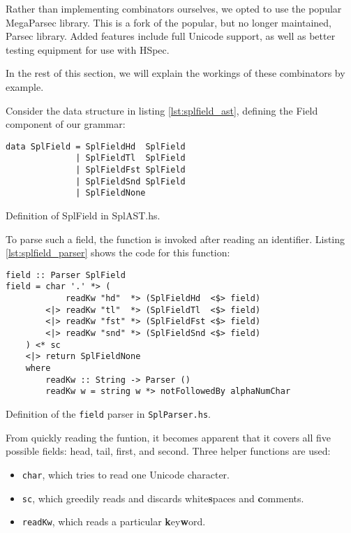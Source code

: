 Rather than implementing combinators ourselves, we opted to use the popular MegaParsec library.
This is a fork of the popular, but no longer maintained, Parsec library.
Added features include full Unicode support, as well as better testing equipment for use with HSpec.

In the rest of this section, we will explain the workings of these combinators by example.

Consider the data structure in listing \ref{lst:splfield_ast}, defining the \textsf{Field} component of our grammar:

\begin{listing}
\begin{framed}
\begin{verbatim}
data SplField = SplFieldHd  SplField
              | SplFieldTl  SplField
              | SplFieldFst SplField
              | SplFieldSnd SplField
              | SplFieldNone
\end{verbatim}
\end{framed}
\caption{Definition of SplField in SplAST.hs.}
\label{lst:splfield_ast}
\end{listing}

To parse such a field, the  function is invoked after reading an identifier.
Listing \ref{lst:splfield_parser} shows the code for this function:

\begin{listing}
\begin{framed}
\begin{verbatim}
field :: Parser SplField
field = char '.' *> (
            readKw "hd"  *> (SplFieldHd  <$> field)
        <|> readKw "tl"  *> (SplFieldTl  <$> field)
        <|> readKw "fst" *> (SplFieldFst <$> field)
        <|> readKw "snd" *> (SplFieldSnd <$> field)
    ) <* sc
    <|> return SplFieldNone
    where
        readKw :: String -> Parser ()
        readKw w = string w *> notFollowedBy alphaNumChar
\end{verbatim}
\end{framed}
\caption{Definition of the \texttt{field} parser in \texttt{SplParser.hs}.}
\label{lst:splfield_parser}
\end{listing}

From quickly reading the funtion, it becomes apparent that it covers all five possible fields: head, tail, first, and second.
Three helper functions are used:
\begin{itemize}
	\setlength{\itemsep}{0pt}
	\item \texttt{char}, which tries to read one Unicode character.
	\item \texttt{sc}, which greedily reads and discards white\textbf{s}paces and \textbf{c}omments.
	\item \texttt{readKw}, which reads a particular \textbf{k}ey\textbf{w}ord.
\end{itemize}

